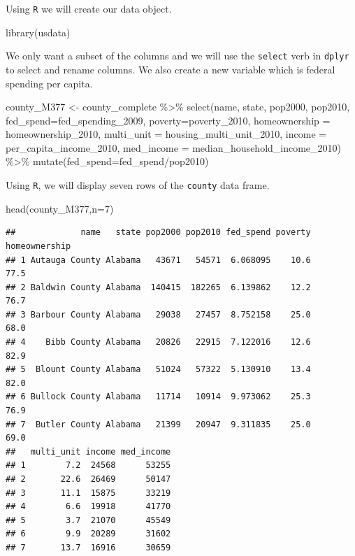 \documentclass[
]{book}
\newenvironment{Shaded}{\begin{snugshade}}{\end{snugshade}}
\newcommand{\AttributeTok}[1]{\textcolor[rgb]{0.77,0.63,0.00}{#1}}
\newcommand{\DecValTok}[1]{\textcolor[rgb]{0.00,0.00,0.81}{#1}}
\newcommand{\FunctionTok}[1]{\textcolor[rgb]{0.00,0.00,0.00}{#1}}
\newcommand{\NormalTok}[1]{#1}
\newcommand{\OtherTok}[1]{\textcolor[rgb]{0.56,0.35,0.01}{#1}}
\newcommand{\SpecialCharTok}[1]{\textcolor[rgb]{0.00,0.00,0.00}{#1}}
\begin{document}
Using \texttt{R} we will create our data object.

\begin{Shaded}
\begin{Highlighting}[]
\FunctionTok{library}\NormalTok{(usdata)}
\end{Highlighting}
\end{Shaded}

We only want a subset of the columns and we will use the \texttt{select} verb in \texttt{dplyr} to select and rename columns. We also create a new variable which is federal spending per capita.

\begin{Shaded}
\begin{Highlighting}[]
\NormalTok{county\_M377 }\OtherTok{\textless{}{-}}\NormalTok{ county\_complete }\SpecialCharTok{\%\textgreater{}\%} 
  \FunctionTok{select}\NormalTok{(name, state, pop2000, pop2010, }\AttributeTok{fed\_spend=}\NormalTok{fed\_spending\_2009, }\AttributeTok{poverty=}\NormalTok{poverty\_2010, }
         \AttributeTok{homeownership =}\NormalTok{ homeownership\_2010, }\AttributeTok{multi\_unit =}\NormalTok{ housing\_multi\_unit\_2010, }
         \AttributeTok{income =}\NormalTok{ per\_capita\_income\_2010, }\AttributeTok{med\_income =}\NormalTok{ median\_household\_income\_2010) }\SpecialCharTok{\%\textgreater{}\%}
  \FunctionTok{mutate}\NormalTok{(}\AttributeTok{fed\_spend=}\NormalTok{fed\_spend}\SpecialCharTok{/}\NormalTok{pop2010)}
\end{Highlighting}
\end{Shaded}

Using \texttt{R}, we will display seven rows of the \texttt{county} data frame.

\begin{Shaded}
\begin{Highlighting}[]
\FunctionTok{head}\NormalTok{(county\_M377,}\AttributeTok{n=}\DecValTok{7}\NormalTok{)}
\end{Highlighting}
\end{Shaded}

\begin{verbatim}
##             name   state pop2000 pop2010 fed_spend poverty homeownership
## 1 Autauga County Alabama   43671   54571  6.068095    10.6          77.5
## 2 Baldwin County Alabama  140415  182265  6.139862    12.2          76.7
## 3 Barbour County Alabama   29038   27457  8.752158    25.0          68.0
## 4    Bibb County Alabama   20826   22915  7.122016    12.6          82.9
## 5  Blount County Alabama   51024   57322  5.130910    13.4          82.0
## 6 Bullock County Alabama   11714   10914  9.973062    25.3          76.9
## 7  Butler County Alabama   21399   20947  9.311835    25.0          69.0
##   multi_unit income med_income
## 1        7.2  24568      53255
## 2       22.6  26469      50147
## 3       11.1  15875      33219
## 4        6.6  19918      41770
## 5        3.7  21070      45549
## 6        9.9  20289      31602
## 7       13.7  16916      30659
\end{verbatim}
\end{document}
